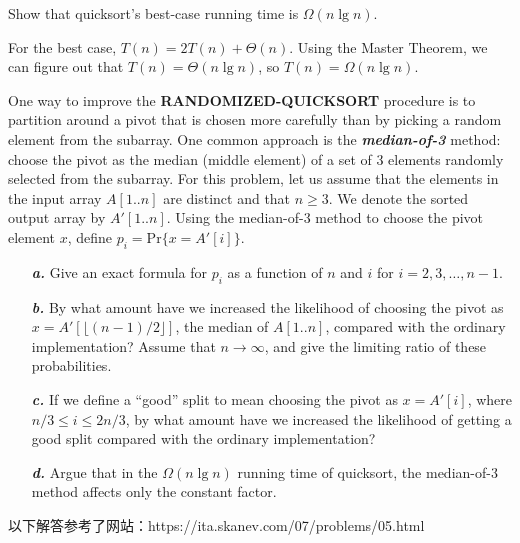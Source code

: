 \documentclass[12pt, a4paper, UTF8]{ctexart}
\begin{document}
\begin{problem}[TC: 7.4-2]
  Show that quicksort's best-case running time is $\Omega(n\lg n)$.
\end{problem}

\begin{solution}
  For the best case, $T(n) = 2T(n) + \Theta(n)$. Using the Master Theorem, 
  we can figure out that $T(n) = \Theta(n\lg n)$, so $T(n) = \Omega(n\lg n)$.
\end{solution}

\begin{problem}[TC: 7-5]
  One way to improve the \textbf{RANDOMIZED-QUICKSORT} procedure is to 
  partition around a pivot that is chosen more carefully than by picking 
  a random element from the subarray. One common approach is the \textbf{\textsl{median-of-3}} 
  method: choose the pivot as the median (middle element) of a set of 
  3 elements randomly selected from the subarray. For this problem, let 
  us assume that the elements in the input array $A[1..n]$ are distinct 
  and that $n\geq 3$. We denote the sorted output array by $A'[1..n]$. 
  Using the median-of-3 method to choose the pivot element $x$, define 
  $p_{i} = \text{Pr}\{x = A'[i]\}$.
  \begin{itemize}
    \item[\textbf{\textsl{a. }}] Give an exact formula for $p_{i}$ as a 
      function of $n$ and $i$ for $i = 2,3,\ldots,n-1$.
    \item[\textbf{\textsl{b. }}] By what amount have we increased the 
      likelihood of choosing the pivot as $x = A'[\lfloor(n-1)/2\rfloor]$, 
      the median of $A[1..n]$, compared with the ordinary implementation? 
      Assume that $n\rightarrow\infty$, and give the limiting ratio of 
      these probabilities.
    \item[\textsl{\textbf{c. }}] If we define a ``good'' split to mean 
      choosing the pivot as $x = A'[i]$, where $n/3\leq i\leq 2n/3$, by 
      what amount have we increased the likelihood of getting a good split 
      compared with the ordinary implementation?
    \item[\textsl{\textbf{d. }}] Argue that in the $\Omega(n\lg n)$ running 
      time of quicksort, the median-of-3 method affects only the constant 
      factor.
  \end{itemize}
\end{problem}

\begin{remark}
  以下解答参考了网站：https://ita.skanev.com/07/problems/05.html
\end{remark}
\end{document}
